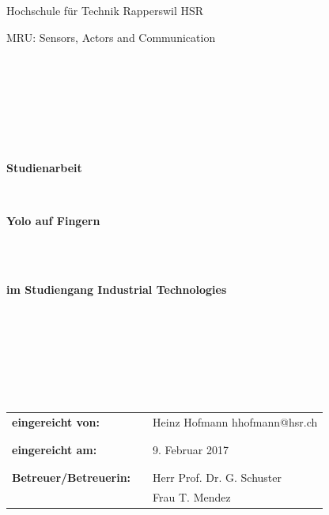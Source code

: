 \documentclass[a4paper,12pt]{article}
\begin{document}
\thispagestyle{empty}
\begin{center}
\Large{Hochschule für Technik Rapperswil HSR}\\
\end{center}

\begin{center}
\Large{MRU: Sensors, Actors and Communication}
\end{center}
\begin{verbatim}







\end{verbatim}
\begin{center}
\textbf{\LARGE{Studienarbeit}}
\end{center}
\begin{verbatim}


\end{verbatim}
\begin{center}
\textbf{\Huge{Yolo auf Fingern}}
\end{center}
\begin{verbatim}



\end{verbatim}
\begin{center}
\textbf{im Studiengang Industrial Technologies}
\end{center}
\begin{verbatim}







\end{verbatim}

\begin{flushleft}
\begin{tabular}{lll}
\textbf{eingereicht von:} & & Heinz Hofmann \flq{}hhofmann@hsr.ch\frq{}\\
& & \\
& & \\
\textbf{eingereicht am:} & & 9. Februar 2017\\
& & \\
& & \\
\textbf{Betreuer/Betreuerin:} & & Herr Prof. Dr. G. Schuster \\
& & Frau T. Mendez
\end{tabular}
\end{flushleft}
\end{document}
